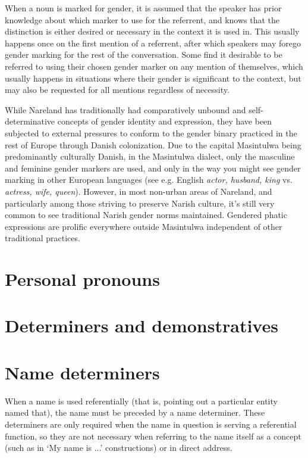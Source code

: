 \documentclass[a4paper,10pt,twoside,openright]{memoir}
\begin{document}
When a noun is marked for gender, it is assumed that the speaker has prior knowledge about which marker to use for the referrent, and knows that the distinction is either desired or necessary in the context it is used in. This usually happens once on the first mention of a referrent, after which speakers may forego gender marking for the rest of the conversation. Some find it desirable to be referred to using their chosen gender marker on any mention of themselves, which usually happens in situations where their gender is significant to the context, but may also be requested for all mentions regardless of necessity.

While Nareland has traditionally had comparatively unbound and self-determinative concepts of gender identity and expression, they have been subjected to external pressures to conform to the gender binary practiced in the rest of Europe through Danish colonization. Due to the capital Masintulwa being predominantly culturally Danish, in the Masintulwa dialect, only the masculine and feminine gender markers are used, and only in the way you might see gender marking in other European languages (see e.g. English \textit{actor, husband, king} vs. \textit{actress, wife, queen}). However, in most non-urban areas of Nareland, and particularly among those striving to preserve Narish culture, it's still very common to see traditional Narish gender norms maintained. Gendered phatic expressions are prolific everywhere outside Masintulwa independent of other traditional practices.


\section{Personal pronouns}

\section{Determiners and demonstratives}

\section{Name determiners}

When a name is used referentially (that is, pointing out a particular entity named that), the name must be preceded by a name determiner. These determiners are only required when the name in question is serving a referential function, so they are not necessary when referring to the name itself as a concept (such as in `My name is ...' constructions) or in direct address.
\end{document}
